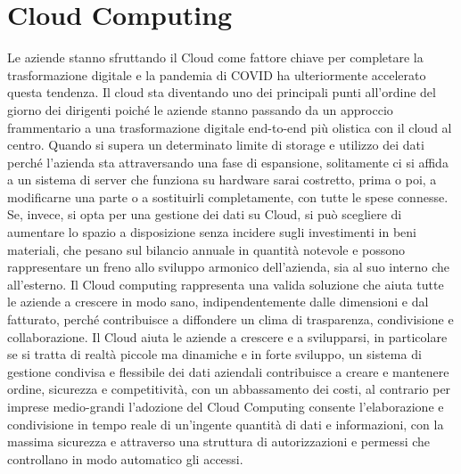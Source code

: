 \section{Cloud Computing} 
Le aziende stanno sfruttando il Cloud come fattore chiave per completare la trasformazione digitale e la pandemia di COVID ha ulteriormente accelerato questa tendenza. Il cloud sta diventando uno dei principali punti all’ordine del giorno dei dirigenti poiché le aziende stanno passando da un approccio frammentario a una trasformazione digitale end-to-end più olistica con il cloud al centro. 
Quando si supera un determinato limite di storage e utilizzo dei dati perché l’azienda sta attraversando una fase di espansione, solitamente ci si affida a un sistema di server che funziona su hardware sarai costretto, prima o poi, a modificarne una parte o a sostituirli completamente, con tutte le spese connesse.
Se, invece, si opta per una gestione dei dati su Cloud, si può scegliere di aumentare lo spazio a disposizione senza incidere sugli investimenti in beni materiali, che pesano sul bilancio annuale in quantità notevole e possono rappresentare un freno allo sviluppo armonico dell’azienda, sia al suo interno che all’esterno. 
Il Cloud computing rappresenta una valida soluzione che aiuta tutte le aziende a crescere in modo sano, indipendentemente dalle dimensioni e dal fatturato, perché contribuisce a diffondere un clima di trasparenza, condivisione e collaborazione.
Il Cloud aiuta le aziende a crescere e a svilupparsi, in particolare se si tratta di realtà piccole ma dinamiche e in forte sviluppo, un sistema di gestione condivisa e flessibile dei dati aziendali contribuisce a creare e mantenere ordine, sicurezza e competitività, con un abbassamento dei costi, al contrario per imprese medio-grandi  l’adozione del Cloud Computing consente l’elaborazione e condivisione in tempo reale di un’ingente quantità di dati e informazioni, con la massima sicurezza e attraverso una struttura di autorizzazioni e permessi che controllano in modo automatico gli accessi.
